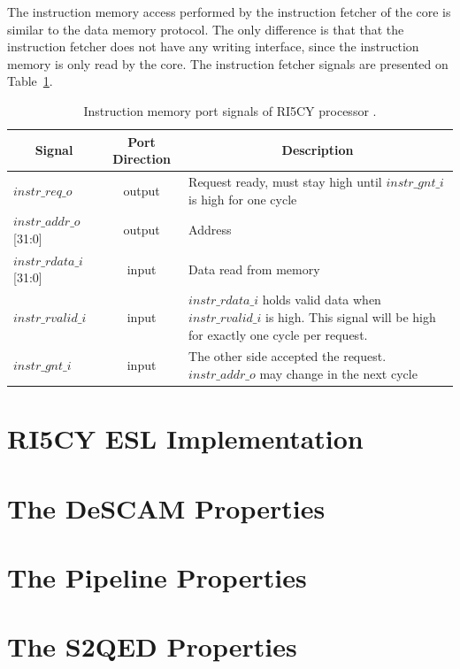 The instruction memory access performed by the instruction fetcher of the core is similar to the data memory protocol. The only difference is that that the instruction fetcher does not have any writing interface, since the instruction memory is only read by the core. The instruction fetcher signals are presented on Table~\ref{tab:imem-signals}.

\begin{table}[htb!] 
	\centering 
	\caption{Instruction memory port signals of RI5CY processor \cite{manual-ri5cy}.} 
	\label{tab:imem-signals}
	\begin{tabular}{l|c|p{7cm}} 
		\multicolumn{1}{c}{\bfseries Signal} & \multicolumn{1}{c}{\bfseries Port Direction} & \multicolumn{1}{c}{\bfseries Description} \\     
		\hline	
		$instr\_req\_o$  &  output & Request ready, must stay high until $instr\_gnt\_i$ is high for one cycle \\
		\hline
		$instr\_addr\_o$[31:0]  &  output & Address \\
		\hline
		$instr\_rdata\_i$[31:0]  &  input & Data read from memory \\
		\hline
		$instr\_rvalid\_i$  &  input & $instr\_rdata\_i$ holds valid data when $instr\_rvalid\_i$ is high. This signal will be high for exactly one cycle per request. \\
		\hline
		$instr\_gnt\_i$  &  input & The other side accepted the request. $instr\_addr\_o$ may change in the next cycle \\
		\hline
	\end{tabular} 
\end{table}

\section{RI5CY ESL Implementation}
\label{section:ri5cy_esl}

\section{The DeSCAM Properties}
\label{section:ri5cy_micro_ppt}

\section{The Pipeline Properties}
\label{section:ri5cy_pipe_ppt}

\section{The S2QED Properties}
\label{section:ri5cy_s2qed_ppt}